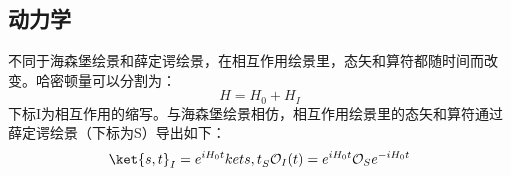 \subsection{动力学}
不同于海森堡绘景和薛定谔绘景，在相互作用绘景里，态矢和算符都随时间而改变。哈密顿量可以分割为：
\begin{equation}
H=H_0+H_I
\end{equation}
下标I为相互作用的缩写。与海森堡绘景相仿，相互作用绘景里的态矢和算符通过薛定谔绘景（下标为S）导出如下：
\begin{equation}
\ket{s,t}_I=e^{iH_0 t}ket{s,t}_S
\mathcal O_I(t)=e^{iH_0 t}\mathcal O_Se^{-iH_0 t}
\end{equation}


